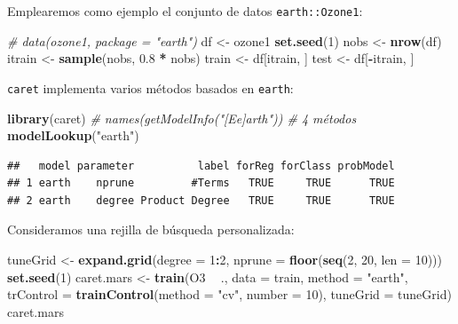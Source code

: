\documentclass[
  spanish,
]{book}
\newenvironment{Shaded}{\begin{snugshade}}{\end{snugshade}}
\newcommand{\CommentTok}[1]{\textcolor[rgb]{0.56,0.35,0.01}{\textit{#1}}}
\newcommand{\DataTypeTok}[1]{\textcolor[rgb]{0.13,0.29,0.53}{#1}}
\newcommand{\DecValTok}[1]{\textcolor[rgb]{0.00,0.00,0.81}{#1}}
\newcommand{\FloatTok}[1]{\textcolor[rgb]{0.00,0.00,0.81}{#1}}
\newcommand{\KeywordTok}[1]{\textcolor[rgb]{0.13,0.29,0.53}{\textbf{#1}}}
\newcommand{\NormalTok}[1]{#1}
\newcommand{\OperatorTok}[1]{\textcolor[rgb]{0.81,0.36,0.00}{\textbf{#1}}}
\newcommand{\StringTok}[1]{\textcolor[rgb]{0.31,0.60,0.02}{#1}}
\theoremstyle{break}
\theoremstyle{definition}
\theoremstyle{definition}
\theoremstyle{definition}
\theoremstyle{remark}
\begin{document}
Emplearemos como ejemplo el conjunto de datos \texttt{earth::Ozone1}:

\begin{Shaded}
\begin{Highlighting}[]
\CommentTok{# data(ozone1, package = "earth")}
\NormalTok{df <-}\StringTok{ }\NormalTok{ozone1  }
\KeywordTok{set.seed}\NormalTok{(}\DecValTok{1}\NormalTok{)}
\NormalTok{nobs <-}\StringTok{ }\KeywordTok{nrow}\NormalTok{(df)}
\NormalTok{itrain <-}\StringTok{ }\KeywordTok{sample}\NormalTok{(nobs, }\FloatTok{0.8} \OperatorTok{*}\StringTok{ }\NormalTok{nobs)}
\NormalTok{train <-}\StringTok{ }\NormalTok{df[itrain, ]}
\NormalTok{test <-}\StringTok{ }\NormalTok{df[}\OperatorTok{-}\NormalTok{itrain, ]}
\end{Highlighting}
\end{Shaded}

\texttt{caret} implementa varios métodos basados en \texttt{earth}:

\begin{Shaded}
\begin{Highlighting}[]
\KeywordTok{library}\NormalTok{(caret)}
\CommentTok{# names(getModelInfo("[Ee]arth")) # 4 métodos}
\KeywordTok{modelLookup}\NormalTok{(}\StringTok{"earth"}\NormalTok{)}
\end{Highlighting}
\end{Shaded}

\begin{verbatim}
##   model parameter          label forReg forClass probModel
## 1 earth    nprune         #Terms   TRUE     TRUE      TRUE
## 2 earth    degree Product Degree   TRUE     TRUE      TRUE
\end{verbatim}

Consideramos una rejilla de búsqueda personalizada:

\begin{Shaded}
\begin{Highlighting}[]
\NormalTok{tuneGrid <-}\StringTok{ }\KeywordTok{expand.grid}\NormalTok{(}\DataTypeTok{degree =} \DecValTok{1}\OperatorTok{:}\DecValTok{2}\NormalTok{, }
                       \DataTypeTok{nprune =} \KeywordTok{floor}\NormalTok{(}\KeywordTok{seq}\NormalTok{(}\DecValTok{2}\NormalTok{, }\DecValTok{20}\NormalTok{, }\DataTypeTok{len =} \DecValTok{10}\NormalTok{)))}
\KeywordTok{set.seed}\NormalTok{(}\DecValTok{1}\NormalTok{)}
\NormalTok{caret.mars <-}\StringTok{ }\KeywordTok{train}\NormalTok{(O3 }\OperatorTok{~}\StringTok{ }\NormalTok{., }\DataTypeTok{data =}\NormalTok{ train, }\DataTypeTok{method =} \StringTok{"earth"}\NormalTok{,}
    \DataTypeTok{trControl =} \KeywordTok{trainControl}\NormalTok{(}\DataTypeTok{method =} \StringTok{"cv"}\NormalTok{, }\DataTypeTok{number =} \DecValTok{10}\NormalTok{),}
    \DataTypeTok{tuneGrid =}\NormalTok{ tuneGrid)}
\NormalTok{caret.mars}
\end{Highlighting}
\end{Shaded}
\end{document}
